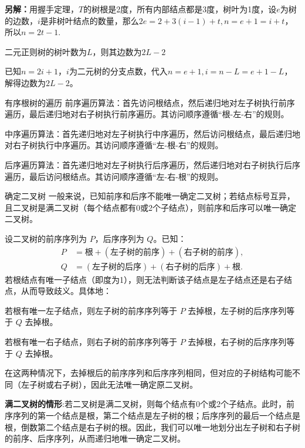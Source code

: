 \textbf{另解：}用握手定理，$T$的树根是2度，所有内部结点都是3度，树叶为1度，设$e$为树的边数，$i$是非树叶结点的数量，那么$2e=2+3(i-1)+t,n=e+1=i+t$，所以$n=2t-1$.
\begin{example}{}{}
    二元正则树的树叶数为$L$，则其边数为$2L-2$
\end{example}
已知$n=2i+1$，$i$为二元树的分支点数，代入$n=e+1,i=n-L=e+1-L$，解得边数为$2L-2$。
\begin{definition}{有序根树的遍历}{}
前序遍历算法：首先访问根结点，然后递归地对左子树执行前序遍历，最后递归地对右子树执行前序遍历。其访问顺序遵循“根-左-右”的规则。

中序遍历算法：首先递归地对左子树执行中序遍历，然后访问根结点，最后递归地对右子树执行中序遍历。其访问顺序遵循“左-根-右”的规则。

后序遍历算法：首先递归地对左子树执行后序遍历，然后递归地对右子树执行后序遍历，最后访问根结点。其访问顺序遵循“左-右-根”的规则。
\end{definition}
\begin{theorem}{确定二叉树}{}
    一般来说，已知前序和后序不能唯一确定二叉树；若结点标号互异，且二叉树是满二叉树（每个结点都有0或2个子结点），则前序和后序可以唯一确定二叉树。
\end{theorem}
设二叉树的前序序列为 $P$，后序序列为 $Q$。已知：
    \begin{align*}
        P &= \text{根} + (\text{左子树的前序}) + (\text{右子树的前序}), \\
        Q &= (\text{左子树的后序}) + (\text{右子树的后序}) + \text{根}.
    \end{align*}
    若根结点有唯一子结点（即度为1），则无法判断该子结点是左子结点还是右子结点，从而导致歧义。具体地：
 
    若根有唯一左子结点，则左子树的前序序列等于 $P$ 去掉根，左子树的后序序列等于 $Q$ 去掉根。
      
    若根有唯一右子结点，则右子树的前序序列等于 $P$ 去掉根，右子树的后序序列等于 $Q$ 去掉根。
    
    在这两种情况下，去掉根后的前序序列和后序序列相同，但对应的子树结构可能不同（左子树或右子树），因此无法唯一确定原二叉树。

    \textbf{ 满二叉树的情形}:若二叉树是满二叉树，则每个结点有0个或2个子结点。此时，前序序列的第一个结点是根，第二个结点是左子树的根；后序序列的最后一个结点是根，倒数第二个结点是右子树的根。因此，我们可以唯一地划分出左子树和右子树的前序、后序序列，从而递归地唯一确定二叉树。

    \vspace{10pt}

